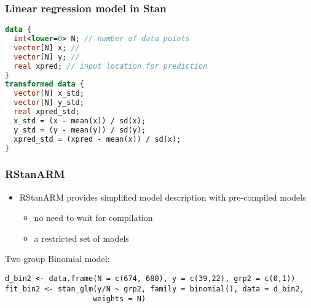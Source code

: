 \documentclass[finnish,english,t]{beamer}
\begin{document}
\begin{frame}[fragile]
  \frametitle{Linear regression model in Stan}
  
  {\scriptsize
\begin{lstlisting}[language=Stan]
data {
  int<lower=0> N; // number of data points
  vector[N] x; //
  vector[N] y; //
  real xpred; // input location for prediction
}
transformed data {
  vector[N] x_std;
  vector[N] y_std;
  real xpred_std;
  x_std = (x - mean(x)) / sd(x);
  y_std = (y - mean(y)) / sd(y);
  xpred_std = (xpred - mean(x)) / sd(x);
}
\end{lstlisting}
  }
\end{frame}


\begin{frame}[fragile]
  \frametitle{RStanARM}

  \begin{itemize}
  \item RStanARM provides simplified model description with
    pre-compiled models
    \begin{itemize}
    \item no need to wait for compilation
    \item a restricted set of models
    \end{itemize}
  \end{itemize}

Two group Binomial model:
  {\scriptsize
\begin{lstlisting}
d_bin2 <- data.frame(N = c(674, 680), y = c(39,22), grp2 = c(0,1))
fit_bin2 <- stan_glm(y/N ~ grp2, family = binomial(), data = d_bin2,
                    weights = N)
\end{lstlisting}
  }

    
\end{frame} 
\end{document}
